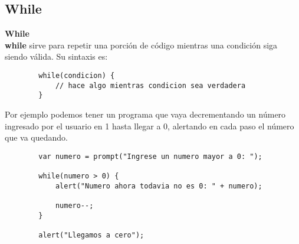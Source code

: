 \documentclass[handout, 10pt]{beamer}
\begin{document}
\subsection{While}
\begin{frame}[fragile]
	\textbf{\large{While}} \\
	
	\textbf{while} sirve para repetir una porción de código mientras una condición siga siendo válida. Su sintaxis
	es:
	
	\begin{lstlisting}
		while(condicion) {
			// hace algo mientras condicion sea verdadera
		} 
	\end{lstlisting}
	
	\pause
	
	Por ejemplo podemos tener un programa que vaya decrementando un número ingresado por el usuario en 1 hasta llegar
	a 0, alertando en cada paso el número que va quedando.
	
	\begin{lstlisting}
		var numero = prompt("Ingrese un numero mayor a 0: ");
		
		while(numero > 0) {
			alert("Numero ahora todavia no es 0: " + numero);
			
			numero--;
		} 
		
		alert("Llegamos a cero");
	\end{lstlisting}
\end{frame}
\end{document}
